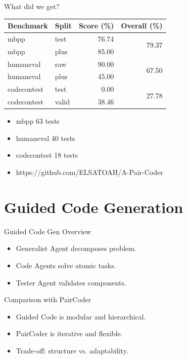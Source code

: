 \documentclass{beamer}
\begin{document}
	\begin{frame}{What did we get?}
	  \begin{table}
	    \centering
	    \begin{tabular}{l l r r}
	      \toprule
	      \textbf{Benchmark} & \textbf{Split} & \textbf{Score (\%)} & \textbf{Overall (\%)} \\
	      \midrule
	      mbpp        & test  & 76.74 & \multirow{2}{*}{79.37} \\
	      mbpp        & plus  & 85.00 & \\
	      \midrule
	      humaneval   & raw   & 90.00 & \multirow{2}{*}{67.50} \\
	      humaneval   & plus  & 45.00 & \\
	      \midrule
	      codecontest & test  &  0.00 & \multirow{2}{*}{27.78} \\
	      codecontest & valid & 38.46 & \\
	      \bottomrule
	    \end{tabular}
	  \end{table}
	   \begin{itemize}
	    \item mbpp 63 tests
	    \item humaneval 40 tests
	    \item codecontest 18 tests
	    \item https://github.com/ELSATOAH/A-Pair-Coder
	  \end{itemize}
	\end{frame}



	
	\section{Guided Code Generation}
	\begin{frame}{Guided Code Gen Overview}
	  \begin{itemize}
	    \item Generalist Agent decomposes problem.
	    \item Code Agents solve atomic tasks.
	    \item Tester Agent validates components.
	  \end{itemize}
	\end{frame}
	
	\begin{frame}{Comparison with PairCoder}
	  \begin{itemize}
	    \item Guided Code is modular and hierarchical.
	    \item PairCoder is iterative and flexible.
	    \item Trade-off: structure vs. adaptability.
	  \end{itemize}
	\end{frame}
	
\end{document}
